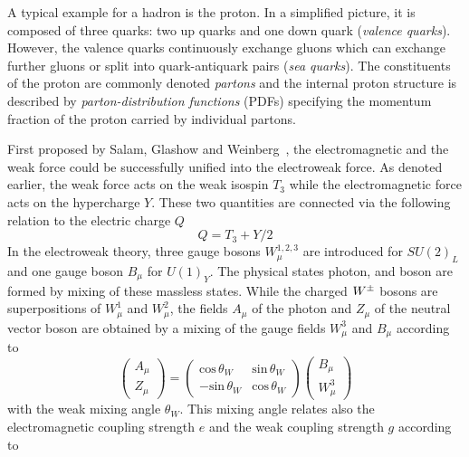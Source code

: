 \begin{description}
\begin{description}
A typical example for a hadron is the proton. In a simplified picture, it is composed of three quarks: two up quarks and one down quark (\textit{valence quarks}). However, the valence quarks continuously exchange gluons which can exchange further gluons or split into quark-antiquark pairs (\textit{sea quarks}). The constituents of the proton are commonly denoted \textit{partons} and the internal proton structure is described by \textit{parton-distribution functions} (PDFs) specifying the momentum fraction of the proton carried by individual partons.
 \end{description}
First proposed by Salam, Glashow and Weinberg~\cite{Glashow:1961tr, Weinberg:1967tq}, the electromagnetic and the weak force could be successfully unified into the electroweak force. As denoted earlier, the weak force acts on the weak isospin $T_{3}$ while the electromagnetic force acts on the hypercharge $Y$. These two quantities are connected via the following relation to the electric charge $Q$
\begin{equation*}
Q = T_{3} + Y/2
\end{equation*}
In the electroweak theory, three gauge bosons $W^{1,2,3}_{\mu}$ are introduced for $SU(2)_{L}$ and one gauge boson $B_{\mu}$ for $U(1)_{Y}$. The physical states photon, \Wpm and \Z boson are formed by mixing of these massless states. While the charged $W^{\pm}$ bosons are superpositions of $W^{1}_{\mu}$ and $W^{2}_{\mu}$, the fields $A_{\mu}$ of the photon and $Z_{\mu}$ of the neutral vector boson are obtained by a mixing of the gauge fields $W^{3}_{\mu}$ and $B_{\mu}$ according to
\begin{equation}
\left(
\begin{matrix}
A_{\mu} \\ Z_{\mu}
\end{matrix}
\right)
=
\left(
\begin{matrix}
\mathrm{cos} \, \theta_{W} & \mathrm{sin} \, \theta_{W} \\
-\mathrm{sin} \, \theta_{W} & \mathrm{cos} \, \theta_{W}
\end{matrix}
\right)
\left(
\begin{matrix}
 B_{\mu} \\ W^{3}_{\mu} 
\end{matrix}
\right)
\end{equation}
with the weak mixing angle $\theta_{W}$. This mixing angle relates also the electromagnetic coupling strength $e$ and the weak coupling strength $g$ according to
\begin{equation}

\end{equation}
\end{description}
